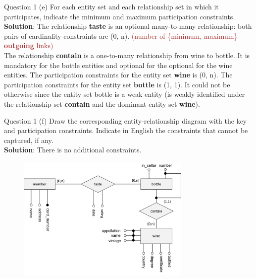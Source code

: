 \begin{frame}[fragile]{Question 1 (e)}
For each entity set and each relationship set in which it participates, indicate the minimum and maximum participation constraints.\\ \vspace{10pt}
\textbf{Solution}: The relationship \textbf{taste} is an optional many-to-many relationship: both pairs of cardinality constraints are (0, n). \textcolor{brown}{(number of \{minimum, maximum\} \textbf{outgoing} links)}\\ \vspace{5pt}
The relationship \textbf{contain} is a one-to-many relationship from wine to bottle. It is mandatory for the bottle entities and optional for the optional for the wine entities. The participation constraints for the entity set \textbf{wine} is (0, n). The participation constraints for the entity set \textbf{bottle} is (1, 1). It could not be otherwise since the entity set bottle is a weak entity (is weakly identified under the relationship set \textbf{contain} and the dominant entity set \textbf{wine}).
\end{frame}


\begin{frame}[fragile]{Question 1 (f)}
Draw the corresponding entity-relationship diagram with the key and participation constraints. Indicate in English the constraints that cannot be captured, if any.\\ \vspace{5pt}
\textbf{Solution}: There is no additional constraints.

\begin{figure}
	\includegraphics[width=0.75\textwidth, trim=0 0 0 0, clip]{t4/images/er_diagram.png}
\end{figure}
\end{frame}


